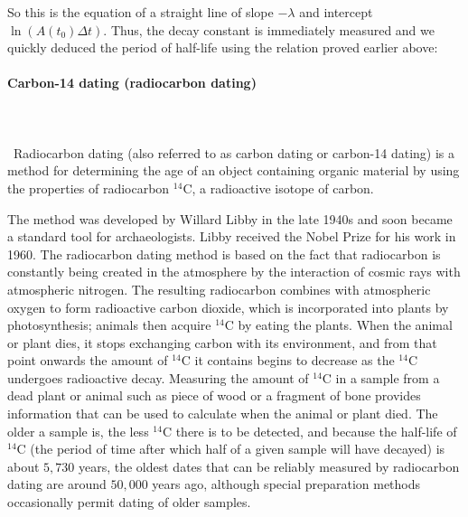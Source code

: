 	So this is the equation of a straight line of slope $-\lambda$ and intercept $\ln(A(t_0)\Delta t)$. Thus, the decay constant is immediately measured and we quickly deduced the period of half-life using the relation proved earlier above:
	
	
	\pagebreak
	\paragraph{Carbon-14 dating (radiocarbon dating)}\mbox{}\\\\\
	Radiocarbon dating (also referred to as carbon dating or carbon-14 dating) is a method for determining the age of an object containing organic material by using the properties of radiocarbon $^{14}\mathrm{C}$, a radioactive isotope of carbon.
	
	The method was developed by Willard Libby in the late 1940s and soon became a standard tool for archaeologists. Libby received the Nobel Prize for his work in 1960. The radiocarbon dating method is based on the fact that radiocarbon is constantly being created in the atmosphere by the interaction of cosmic rays with atmospheric nitrogen. The resulting radiocarbon combines with atmospheric oxygen to form radioactive carbon dioxide, which is incorporated into plants by photosynthesis; animals then acquire $^{14}\mathrm{C}$ by eating the plants. When the animal or plant dies, it stops exchanging carbon with its environment, and from that point onwards the amount of $^{14}\mathrm{C}$ it contains begins to decrease as the $^{14}\mathrm{C}$ undergoes radioactive decay. Measuring the amount of $^{14}\mathrm{C}$ in a sample from a dead plant or animal such as piece of wood or a fragment of bone provides information that can be used to calculate when the animal or plant died. The older a sample is, the less $^{14}\mathrm{C}$ there is to be detected, and because the half-life of $^{14}\mathrm{C}$ (the period of time after which half of a given sample will have decayed) is about $5,730$ years, the oldest dates that can be reliably measured by radiocarbon dating are around $50,000$ years ago, although special preparation methods occasionally permit dating of older samples.

